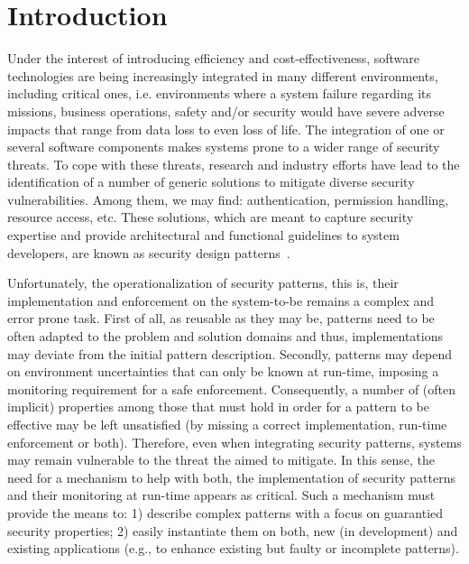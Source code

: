 \section{Introduction}
\label{sec:introduction}
Under the interest of introducing efficiency and cost-effectiveness, software technologies are being increasingly integrated in many different environments, including critical ones, i.e. environments where a system failure regarding its missions, business operations, safety and/or security would have severe adverse impacts that range from data loss to even loss of life. The integration of one or several software components makes systems prone to a wider range of security threats. To cope with these threats, research and industry efforts have lead to the identification of a number of generic solutions to mitigate diverse security vulnerabilities. Among them, we may find: authentication, permission handling, resource access, etc. These solutions, which are meant to capture security expertise and provide architectural and functional guidelines to system developers, are known as security design patterns~\cite{fernandez2013, yoshioka2008, washizaki2018taxonomy}.

Unfortunately, the operationalization of security patterns, this is, their implementation and enforcement on the system-to-be remains a complex and error prone task. First of all, as reusable as they may be, patterns need to be often adapted to the problem and solution domains and thus, implementations may deviate from the initial pattern description. Secondly, patterns may depend on environment uncertainties that can only be known at run-time, imposing a monitoring requirement for a safe enforcement. Consequently, a number of (often implicit) properties among those that must hold in order for a pattern to be effective may be left unsatisfied (by missing a correct implementation, run-time enforcement or both). Therefore, even when integrating security patterns, systems may remain vulnerable to the threat the aimed to mitigate. In this sense, the need for a mechanism to help with both, the implementation of security patterns and their monitoring at run-time appears as critical. Such a mechanism must provide the means to: 1) describe complex patterns with a focus on guarantied security properties; 2) easily instantiate them on both, new (in development) and existing applications (e.g., to enhance existing but faulty or incomplete patterns). 

